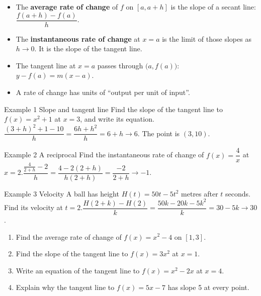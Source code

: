 \documentclass[11pt]{article}
\begin{document}

\begin{ideabox}
\begin{itemize}[leftmargin=*,itemsep=2pt,topsep=2pt]
  \item The \textbf{average rate of change} of $f$ on $[a,a+h]$ is the slope of a secant line: $\dfrac{f(a+h)-f(a)}{h}$.
  \item The \textbf{instantaneous rate of change} at $x=a$ is the limit of those slopes as $h\to0$. It is the slope of the tangent line.
  \item The tangent line at $x=a$ passes through $\big(a,f(a)\big)$: \ $y-f(a)=m(x-a)$.
  \item A rate of change has units of \textquotedblleft{}output per unit of input\textquotedblright{}.
\end{itemize}
\end{ideabox}

\begin{example}{Example 1 \textperiodcentered{} Slope and tangent line}
Find the slope of the tangent line to $f(x)=x^2+1$ at $x=3$, and write its equation.\soln $\dfrac{(3+h)^2+1-10}{h}=\dfrac{6h+h^2}{h}=6+h\to6$. The point is $(3,10)$.
\end{example}

\begin{example}{Example 2 \textperiodcentered{} A reciprocal}
Find the instantaneous rate of change of $f(x)=\dfrac4x$ at $x=2$.\soln $\dfrac{\frac{4}{2+h}-2}{h}=\dfrac{4-2(2+h)}{h(2+h)}=\dfrac{-2}{2+h}\to-1$.
\end{example}

\begin{example}{Example 3 \textperiodcentered{} Velocity}
A ball has height $H(t)=50t-5t^2$ metres after $t$ seconds. Find its velocity at $t=2$.\soln $\dfrac{H(2+k)-H(2)}{k}=\dfrac{50k-20k-5k^2}{k}=30-5k\to30$.
\end{example}

\newpage
{}

\begin{enumerate}[leftmargin=*,itemsep=2pt]
  \item Find the average rate of change of $f(x)=x^2-4$ on $[1,3]$.\work{2.3cm}
  \item Find the slope of the tangent line to $f(x)=3x^2$ at $x=1$.\work{2.3cm}
  \item Write an equation of the tangent line to $f(x)=x^2-2x$ at $x=4$.\work{2.3cm}
  \item Explain why the tangent line to $f(x)=5x-7$ has slope 5 at every point.\work{2.3cm}
\end{enumerate}
\end{document}
